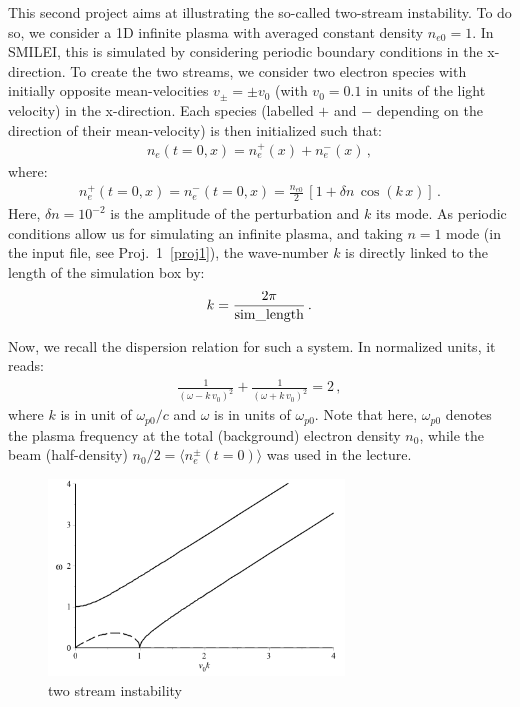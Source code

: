 \documentclass[11pt,a4paper]{article}
\begin{document}
This second project aims at illustrating the so-called two-stream instability.
To do so, we consider a 1D infinite plasma with averaged constant density $n_{e0} = 1$. 
In SMILEI, this is simulated by considering periodic boundary conditions in the x-direction. 
To create the two streams, we consider two electron species with initially opposite mean-velocities $v_{\pm} = \pm v_0$ (with $v_0 = 0.1$ in units of the light velocity) in the x-direction.
Each species (labelled $+$ and $-$ depending on the direction of their mean-velocity) is then initialized such that:
\begin{eqnarray}\label{eq_2stream1}
n_e(t=0,x) = n_e^+(x) + n_e^-(x)\,,
\end{eqnarray}
where:
\begin{eqnarray}\label{eq_2stream2}
n_e^+(t=0,x) = n_e^-(t=0,x) = \frac{n_{e0}}{2}\,[1 + \delta n\,\cos(k\,x)]\,.
\end{eqnarray}
Here, $\delta n = 10^{-2}$ is the amplitude of the perturbation and $k$ its mode.
As periodic conditions allow us for simulating an infinite plasma, and taking $n=1$ mode  (in the input file, see Proj.~1~\ref{proj1}), the wave-number $k$ is directly linked to the length of the simulation box by:
\begin{eqnarray}\label{eq_k}
k = \frac{2\pi}{\rm sim\_length}\,.
\end{eqnarray}

Now, we recall the dispersion relation for such a system. In normalized units, it reads:
\begin{eqnarray}\label{eq_disprel_2stream}
\frac{1}{(\omega - k\,v_0)^2} + \frac{1}{(\omega + k\,v_0)^2} = 2\,,
\end{eqnarray}
where $k$ is in unit of $\omega_{p0}/c$ and $\omega$ is in units of $\omega_{p0}$.
Note that here, $\omega_{p0}$ denotes the plasma frequency at the total (background) electron density $n_0$, while the beam (half-density) $n_0/2 = \langle n_e^{\pm}(t=0) \rangle$ was used in the lecture.

\begin{figure}
\centering\includegraphics[width=0.7\textwidth]{Fig_2stream.png}
\caption{two stream instability}
\label{Fig_2stream}
\end{figure}
\end{document}

